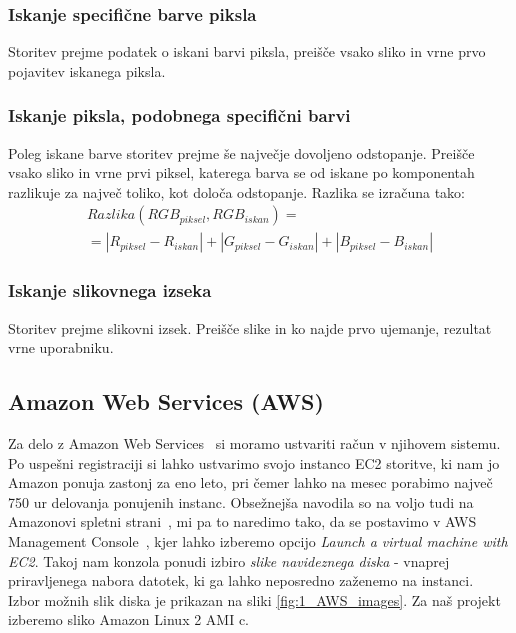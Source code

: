\subsubsection{Iskanje specifične barve piksla}

Storitev prejme podatek o iskani barvi piksla, preišče vsako sliko in vrne prvo pojavitev iskanega piksla.

\subsubsection{Iskanje piksla, podobnega specifični barvi}

Poleg iskane barve storitev prejme še največje dovoljeno odstopanje.
Preišče vsako sliko in vrne prvi piksel, katerega barva se od iskane po komponentah razlikuje za največ toliko, kot določa odstopanje.
Razlika se izračuna tako:
\begin{multline}
Razlika(RGB_{piksel}, RGB_{iskan}) = \\ = |R_{piksel} - R_{iskan}| + |G_{piksel} - G_{iskan}| + |B_{piksel} - B_{iskan}|
\end{multline}

\subsubsection{Iskanje slikovnega izseka}

Storitev prejme slikovni izsek.
Preišče slike in ko najde prvo ujemanje, rezultat vrne uporabniku.

\subsection{Amazon Web Services (AWS)}

Za delo z Amazon Web Services~\cite{1_aws_amazon} si moramo ustvariti račun v njihovem sistemu. Po uspešni registraciji si lahko ustvarimo svojo instanco EC2 storitve, ki nam jo Amazon ponuja zastonj za eno leto, pri čemer lahko na mesec porabimo največ 750 ur delovanja ponujenih instanc. Obsežnejša navodila so na voljo tudi na Amazonovi spletni strani~\cite{1_aws_amazon_tutorial}, mi pa to naredimo tako, da se postavimo v AWS Management Console~\cite{1_aws_amazon_console}, kjer lahko izberemo opcijo \emph{Launch a virtual machine with EC2}. Takoj nam konzola ponudi izbiro \emph{slike navideznega diska} - vnaprej priravljenega nabora datotek, ki ga lahko neposredno zaženemo na instanci.~\cite{1_aws_amazon_ami} Izbor možnih slik diska je prikazan na sliki \ref{fig:1_AWS_images}. Za naš projekt izberemo sliko Amazon Linux 2 AMI c.

